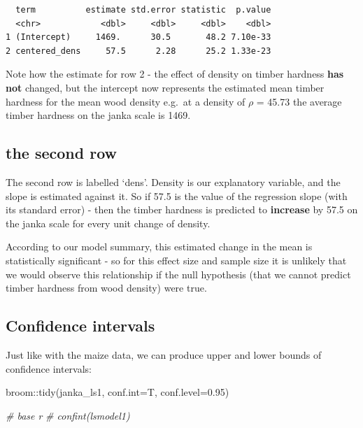 \documentclass[
]{book}
\newenvironment{Shaded}{\begin{snugshade}}{\end{snugshade}}
\newcommand{\AttributeTok}[1]{\textcolor[rgb]{0.77,0.63,0.00}{#1}}
\newcommand{\CommentTok}[1]{\textcolor[rgb]{0.56,0.35,0.01}{\textit{#1}}}
\newcommand{\FloatTok}[1]{\textcolor[rgb]{0.00,0.00,0.81}{#1}}
\newcommand{\FunctionTok}[1]{\textcolor[rgb]{0.00,0.00,0.00}{#1}}
\newcommand{\NormalTok}[1]{#1}
\newcommand{\SpecialCharTok}[1]{\textcolor[rgb]{0.00,0.00,0.00}{#1}}
\begin{document}
\begin{verbatim}
  term          estimate std.error statistic  p.value
  <chr>            <dbl>     <dbl>     <dbl>    <dbl>
1 (Intercept)     1469.      30.5       48.2 7.10e-33
2 centered_dens     57.5      2.28      25.2 1.33e-23
\end{verbatim}

Note how the estimate for row 2 - the effect of density on timber hardness \textbf{has not} changed, but the intercept now represents the estimated mean timber hardness for the mean wood density e.g.~at a density of \(\rho\) = 45.73 the average timber hardness on the janka scale is 1469.

\hypertarget{the-second-row}{%
\subsection{the second row}\label{the-second-row}}

The second row is labelled `dens'. Density is our explanatory variable, and the slope is estimated against it. So if 57.5 is the value of the regression slope (with its standard error) - then the timber hardness is predicted to \textbf{increase} by 57.5 on the janka scale for every unit change of density.

According to our model summary, this estimated change in the mean is statistically significant - so for this effect size and sample size it is unlikely that we would observe this relationship if the null hypothesis (that we cannot predict timber hardness from wood density) were true.

\hypertarget{confidence-intervals-2}{%
\subsection{Confidence intervals}\label{confidence-intervals-2}}

Just like with the maize data, we can produce upper and lower bounds of confidence intervals:

\begin{Shaded}
\begin{Highlighting}[]
\NormalTok{broom}\SpecialCharTok{::}\FunctionTok{tidy}\NormalTok{(janka\_ls1, }\AttributeTok{conf.int=}\NormalTok{T, }\AttributeTok{conf.level=}\FloatTok{0.95}\NormalTok{)}

\CommentTok{\# base r}
\CommentTok{\# confint(lsmodel1)}
\end{Highlighting}
\end{Shaded}
\end{document}
